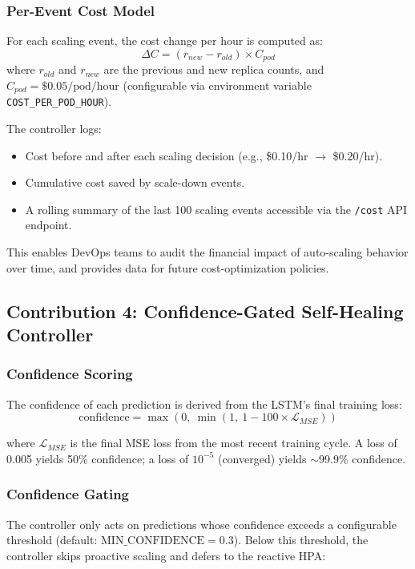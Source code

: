 \documentclass[journal]{IEEEtran}
\begin{document}
\subsubsection{Per-Event Cost Model}
For each scaling event, the cost change per hour is computed as:
\begin{equation}
\Delta C = (r_{new} - r_{old}) \times C_{pod}
\label{eq:cost}
\end{equation}
where $r_{old}$ and $r_{new}$ are the previous and new replica counts, and $C_{pod} = \$0.05/\text{pod/hour}$ (configurable via environment variable \texttt{COST\_PER\_POD\_HOUR}).

The controller logs:
\begin{itemize}
    \item Cost before and after each scaling decision (e.g., \$0.10/hr $\to$ \$0.20/hr).
    \item Cumulative cost saved by scale-down events.
    \item A rolling summary of the last 100 scaling events accessible via the \texttt{/cost} API endpoint.
\end{itemize}

This enables DevOps teams to audit the financial impact of auto-scaling behavior over time, and provides data for future cost-optimization policies.

\subsection{Contribution 4: Confidence-Gated Self-Healing Controller}
\label{sec:confidence}

\subsubsection{Confidence Scoring}
The confidence of each prediction is derived from the LSTM's final training loss:
\begin{equation}
\text{confidence} = \max\left(0,\ \min\left(1,\ 1 - 100 \times \mathcal{L}_{MSE}\right)\right)
\label{eq:confidence}
\end{equation}

where $\mathcal{L}_{MSE}$ is the final MSE loss from the most recent training cycle. A loss of 0.005 yields 50\% confidence; a loss of $10^{-5}$ (converged) yields $\sim$99.9\% confidence.

\subsubsection{Confidence Gating}
The controller only acts on predictions whose confidence exceeds a configurable threshold (default: $\text{MIN\_CONFIDENCE} = 0.3$). Below this threshold, the controller skips proactive scaling and defers to the reactive HPA:
\end{document}
